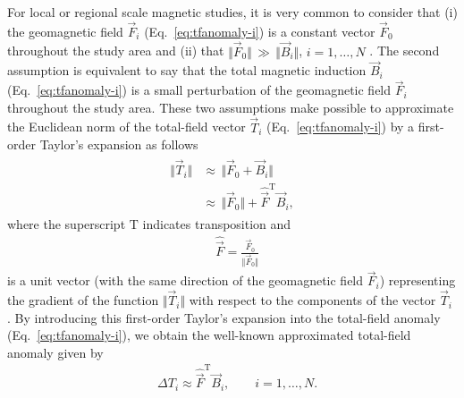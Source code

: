 \documentclass[journal abbreviation, npg]{copernicus}
\begin{document}
For local or regional scale magnetic studies, it is very common to consider
that (i) the geomagnetic field $\vec{F}_i$ (Eq.~\ref{eq:tfanomaly-i}) is
a constant vector $\vec{F}_{0}$ throughout the study area and (ii) that
$\Vert \vec{F}_{0} \Vert\,\gg\, \Vert \vec{B}_{i} \Vert$, $i = 1, \ldots, N$
\citep{telford-etal1990,blakely1996}. The second assumption is equivalent to
say that the total magnetic induction $\vec{B}_i$ (Eq.~\ref{eq:tfanomaly-i})
is a small perturbation of the geomagnetic field $\vec{F}_i$ throughout the
study area. These two assumptions make possible to approximate the Euclidean
norm of the total-field vector $\vec{T}_i$ (Eq.~\ref{eq:tfanomaly-i}) by
a first-order Taylor's expansion as follows
\begin{align}
\begin{aligned}
\Vert \vec{T}_{i} \Vert & \approx\, \Vert \vec{F}_{0} + \vec{B}_{i} \Vert \\
 &\approx\, \Vert \vec{F}_{0} \Vert + \hat{\vec{F}}^{\mathrm{T}}\vec{B}_{i} ,
\end{aligned}
\label{eq:total-field-app}
\end{align}
where the superscript $\mathrm{T}$ indicates transposition and
\begin{align}
 &
\hat{\vec{F}} = \frac{\vec{F}_{0}}{\Vert \vec{F}_{0} \Vert}
\label{eq:unit-vector}
\end{align}
is a unit vector (with the same direction of the geomagnetic field
$\vec{F}_i$) representing the gradient of the function $\Vert
\vec{T}_{i} \Vert$ with respect to the components of the vector
$\vec{T}_{i}$ \citep{blakely1996}. By introducing this first-order
Taylor's expansion into the total-field anomaly
(Eq.~\ref{eq:tfanomaly-i}), we obtain the well-known approximated
total-field anomaly given by
\begin{align}
 &
\Delta T_{i} \approx \hat{\vec{F}}^{\mathrm{T}}\vec{B}_{i} , \qquad i = 1, \ldots, N .
\label{eq:approx-tfanomaly-i}
\end{align}
\end{document}
